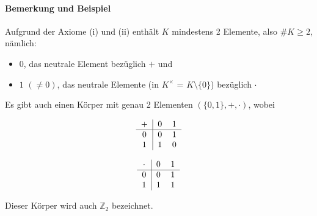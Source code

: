 \paragraph{Bemerkung und Beispiel}
	Aufgrund der Axiome (i) und (ii) enthält $ K $ mindestens 2 Elemente, also $ \# K \geq 2 $, nämlich:
	\begin{itemize}
		\item $ 0 $, das neutrale Element bezüglich $+$ und
		\item $1$ $(\neq 0)$, das neutrale Elemente (in $K^\times$ = $K\setminus\{0\}$) bezüglich $\cdot$
	\end{itemize}
	Es gibt auch einen Körper mit genau 2 Elementen $(\{0,1\},+,\cdot)$, wobei
	
	\begin{minipage}{0.45\textwidth}
		\begin{equation*}
			\begin{tabular}{c|cc}
				$+$ & 0 & 1\\\hline
				0 & 0 & 1\\
				1 & 1 & 0\\
			\end{tabular}
		\end{equation*}
	\end{minipage}
	\begin{minipage}{0.45\textwidth}
		\begin{equation*}
			\begin{tabular}{c|cc}
				$\cdot$ & 0 & 1\\\hline
				0 & 0 & 1\\
				1 & 1 & 1\\
			\end{tabular}
		\end{equation*}
	\end{minipage}
	
	Dieser Körper wird auch $\mathbb{Z}_2$ bezeichnet.

